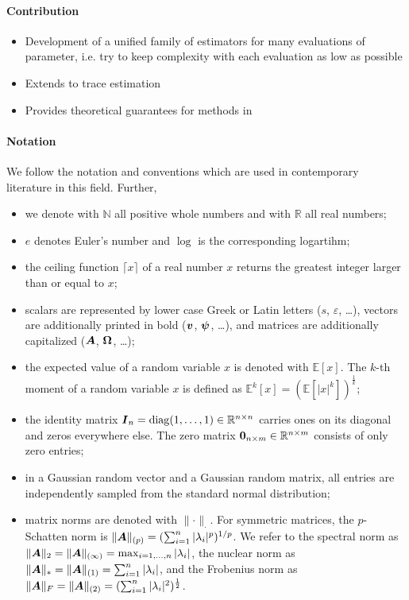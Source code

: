 \documentclass[12pt]{article}
\begin{document}
\paragraph{Contribution}
\begin{itemize}
    \item Development of a unified family of estimators for many evaluations of parameter, i.e. try to keep complexity with each evaluation as low as possible
    \item Extends \cite{kressner-2023-randomized-lowrank} to trace estimation
    \item Provides theoretical guarantees for methods in \cite{lin-2017-randomized-estimation}
\end{itemize}

\paragraph{Notation}
We follow the notation and conventions which are used in contemporary literature in this field. Further,
\begin{itemize}
    \item we denote with $\mathbb{N}$ all positive whole numbers and with $\mathbb{R}$ all real numbers;
    \item $e$ denotes Euler's number and $\log$ is the corresponding logartihm;
    \item the ceiling function $\lceil x \rceil$ of a real number $x$ returns the greatest integer larger than or equal to $x$;
    \item scalars are represented by lower case Greek or Latin letters ($s$, $\varepsilon$, \dots),
    vectors are additionally printed in bold ($\boldsymbol{v}$, $\boldsymbol{\psi}$, \dots),
    and matrices are additionally capitalized ($\boldsymbol{A}$, $\boldsymbol{\Omega}$, \dots);
    \item the expected value of a random variable $x$ is denoted with $\mathbb{E}[x]$. The $k$-th moment of a random variable $x$ is defined as $\mathbb{E}^{k}[x] = \left(\mathbb{E}\left[ | x |^{k} \right] \right)^{\frac{1}{k}}$;
    \item the identity matrix $\boldsymbol{I}_n = \operatorname{diag}(1, \dots, 1) \in \mathbb{R}^{n \times n}$
    carries ones on its diagonal and zeros everywhere else. The zero matrix
    $\boldsymbol{0}_{n \times m} \in \mathbb{R}^{n \times m}$ consists of only zero entries;
    \item in a Gaussian random vector and a Gaussian random matrix, all entries are independently sampled from the standard normal distribution;
    \item matrix norms are denoted with $\lVert \cdot \rVert _{\cdot}$. For symmetric matrices, the $p$-Schatten norm is
    $\lVert \boldsymbol{A} \rVert _{(p)} = (\sum_{i=1}^n |\lambda_i|^p)^{1/p}$. We refer to the spectral norm as $\lVert \boldsymbol{A} \rVert _2 = \lVert \boldsymbol{A} \rVert _{(\infty)} = \max_{i=1,\dots,n}|\lambda_i|$, the nuclear norm as $\lVert \boldsymbol{A} \rVert _{\ast} = \lVert \boldsymbol{A} \rVert _{(1)} = \sum_{i=1}^{n} |\lambda_i|$, and the Frobenius norm as $\lVert \boldsymbol{A} \rVert _F = \lVert \boldsymbol{A} \rVert _{(2)} = (\sum_{i=1}^{n} |\lambda_i|^2)^{\frac{1}{2}}$.
\end{itemize}
\end{document}
